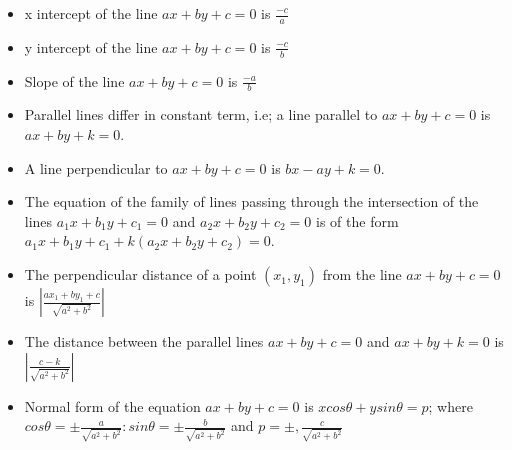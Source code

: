 \documentclass[12pt]{article}
\begin{document}
\begin{multicols}{2}
\begin{itemize}
    \item x intercept of the line $ax + by + c = 0$ is $\frac{-c}{a}$
    \item y intercept of the line $ax + by + c = 0$ is $\frac{-c}{b}$
    \item Slope of the line $ax + by + c = 0$ is $\frac{-a}{b}$
    \item  Parallel lines differ in constant term, i.e; a line parallel to $ax + by + c = 0$ is $ax + by + k = 0$.
    \item  A line perpendicular to $ax + by + c = 0$ is $bx - ay + k = 0$.
    \item The equation of the family of lines passing through the intersection of the lines $a_1x + b_1y + c_1 = 0$ and $a_2x + b_2y + c_2 = 0$ is of the form $a_1x + b_1y + c_1 + k(a_2x + b_2y + c_2) = 0$.
    \item The perpendicular distance of a point $(x_1, y_1)$ from the line $ax + by + c = 0$ is $|\frac{ax_1+by_1+c}{\sqrt{a^2+b^2}}|$
    \item The distance between the parallel lines $ax + by + c = 0$ and $ax + by + k = 0$ is $|\frac{c-k}{\sqrt{a^2+b^2}}|$
    \item Normal form of the equation $ax + by + c = 0$ is $x cos \theta + y sin \theta = p$; where $cos \theta =\pm \frac{a}{\sqrt{a^2+b^2}}:sin \theta =\pm \frac{b}{\sqrt{a^2+b^2}}$ and $p= \pm,\frac{c}{\sqrt{a^2+b^2}} $
\end{itemize}
\end{multicols}
\end{document}
